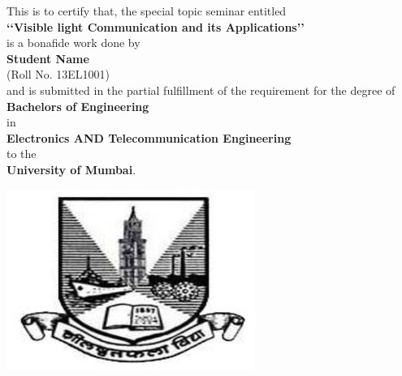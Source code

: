 \begin{center}
\large This is to certify that, the special topic seminar entitled
\vspace{0.15in}\\\textbf {\lq\lq Visible light Communication and its Applications\rq\rq} \\
\vspace{0.1in}is a bonafide work done by\vspace{0.15in}
\\\textbf { Student Name} \\
(Roll No. 13EL1001)\\\vspace{0.1in} and is submitted in the partial
fulfillment of
the requirement for the degree of \vspace{0.15in} \\\textbf{Bachelors of Engineering}\\
in \\\textbf{Electronics AND Telecommunication Engineering} \\to the \\\textbf{University
of Mumbai}.


\includegraphics{university.eps}

 \vspace{0.2in}
%
%
%
\begin{tabular}{ccc}


\end{tabular}
\end{center}
